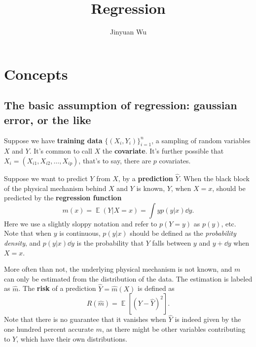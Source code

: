 \documentclass[hyperref, a4paper]{article}
\title{Regression}
\author{Jinyuan Wu}
\DeclareMathOperator{\expect}{\mathbb{E}}
\newcommand*{\concept}[1]{{\textbf{#1}}}
\begin{document}
\maketitle

\section{Concepts}

\subsection{The basic assumption of regression: gaussian error, or the like}

Suppose we have \concept{training data} $\{ (X_i, Y_i) \}_{i=1}^n$,
a sampling of random variables $X$ and $Y$.
It's common to call $X$ the \concept{covariate}.
It's further possible that $X_i = (X_{i1}, X_{i2}, \ldots, X_{ip})$,
that's to say, there are $p$ covariates.

Suppose we want to predict $Y$ from $X$,
by a \concept{prediction} $\hat{Y}$.
When the black block of the physical mechanism behind $X$ and $Y$ is known,
$Y$, when $X = x$, should be predicted by the \concept{regression function}
\begin{equation}
    m(x) = \expect (Y | X = x) = \int y p(y | x) \dd{y}.
\end{equation}
Here we use a slightly sloppy notation and refer to $p(Y = y)$ as $p(y)$, etc.
Note that when $y$ is continuous, $p(y | x)$ should be defined as the 
\emph{probability density}, and $p(y | x) \dd{y}$ is the probability
that $Y$ falls between $y$ and $y + \dd{y}$ when $X = x$.

More often than not, the underlying physical mechanism is not known,
and $m$ can only be estimated from the distribution of the data.
The estimation is labeled as $\hat{m}$.
The \concept{risk} of a prediction $\hat{Y} = \hat{m}(X)$ is defined as 
\begin{equation}
    R(\hat{m}) = \expect[(Y - \hat{Y})^2].
    \label{eq:risk-def}
\end{equation}
Note that there is no guarantee that it vanishes when $\hat{Y}$ is indeed given
by the one hundred percent accurate $m$,
as there might be other variables contributing to $Y$,
which have their own distributions.
\end{document}
